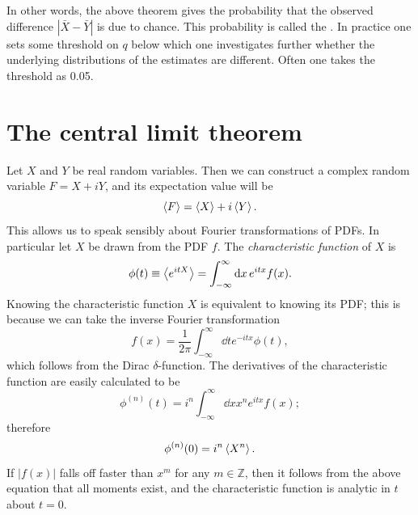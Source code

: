 In other words, the above theorem gives the probability that the
observed difference $|\bar{X}-\bar{Y}|$ is due to chance. This probability
is called the . In practice one sets some 
threshold on $q$ below which one investigates further whether the 
underlying distributions of the estimates are different. Often one 
takes the threshold as 0.05.

\section{The central limit theorem}\label{sec:CLT}

Let $X$ and $Y$ be real random variables. Then we can construct a
complex random variable $F=X+iY$, and its expectation value will be
\begin{equation}
  \ev{F}=\ev{X}+i\ev{Y}.
\end{equation}
This allows us to speak sensibly about Fourier transformations of
PDFs. In particular let $X$ be drawn from the PDF $f$.
The {\it characteristic function}
 of $X$ is
\begin{equation}
  \phi(t)\equiv\ev{e^{itX}}=\int_{-\infty}^\infty\dd{x}e^{itx}f(x).
\end{equation}
Knowing the characteristic function $X$ is equivalent to knowing its PDF;
this is because we can take the inverse Fourier transformation
\begin{equation}
  f(x)=\frac{1}{2\pi}\int_{-\infty}^\infty\dd{t}e^{-itx}\phi(t),
\end{equation}
which follows from the Dirac $\delta$-function. The derivatives of the
characteristic function are easily calculated to be
\begin{equation}
  \phi^{(n)}(t)=i^n\int_{-\infty}^\infty\dd{x}x^ne^{itx}f(x);
\end{equation}
therefore
\begin{equation}
  \phi^{(n)}(0)=i^n\ev{X^n}.
\end{equation}
If $|f(x)|$ falls off faster than $x^m$ for any $m\in\mathbb{Z}$, then
it follows from the above equation that all moments exist, and the
characteristic function is analytic in $t$ about $t=0$.

